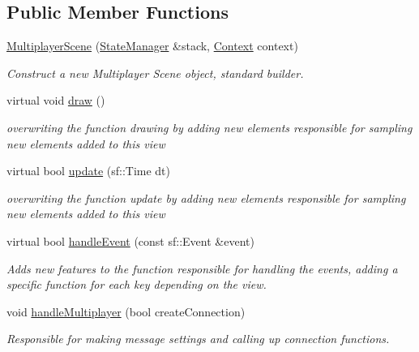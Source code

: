 \subsection*{Public Member Functions}
\begin{DoxyCompactItemize}
\item 
\hyperlink{classMultiplayerScene_a0a555300aaf7b66d983e35c8b6dbe495}{Multiplayer\+Scene} (\hyperlink{classStateManager}{State\+Manager} \&stack, \hyperlink{structState_1_1Context}{Context} context)
\begin{DoxyCompactList}\small\item\em Construct a new Multiplayer Scene object, standard builder. \end{DoxyCompactList}\item 
\mbox{\label{classMultiplayerScene_ad6398a29ef541078c1697f043ed53fbe}} 
virtual void \hyperlink{classMultiplayerScene_ad6398a29ef541078c1697f043ed53fbe}{draw} ()
\begin{DoxyCompactList}\small\item\em overwriting the function drawing by adding new elements responsible for sampling new elements added to this view \end{DoxyCompactList}\item 
virtual bool \hyperlink{classMultiplayerScene_a7d55178de89a4de08bdd1aaa7561756e}{update} (sf\+::\+Time dt)
\begin{DoxyCompactList}\small\item\em overwriting the function update by adding new elements responsible for sampling new elements added to this view \end{DoxyCompactList}\item 
virtual bool \hyperlink{classMultiplayerScene_af2bcc458cda1d272acabc342eb79d25a}{handle\+Event} (const sf\+::\+Event \&event)
\begin{DoxyCompactList}\small\item\em Adds new features to the function responsible for handling the events, adding a specific function for each key depending on the view. \end{DoxyCompactList}\item 
void \hyperlink{classMultiplayerScene_afec1f9d6c9cf3e1bc9d6a2485bd4ed46}{handle\+Multiplayer} (bool create\+Connection)
\begin{DoxyCompactList}\small\item\em Responsible for making message settings and calling up connection functions. \end{DoxyCompactList}\end{DoxyCompactItemize}
